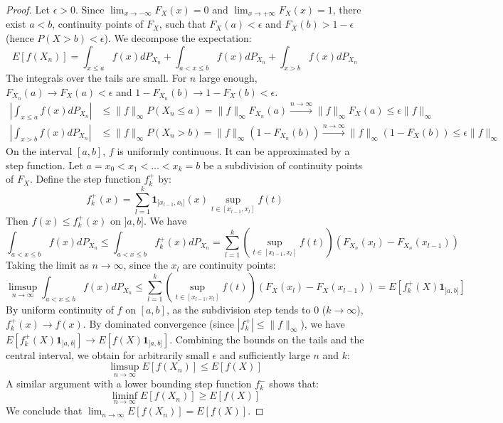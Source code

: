 \begin{proof}
Let $\epsilon > 0$. Since $\lim_{x \to -\infty} F_X(x) = 0$ and $\lim_{x \to +\infty} F_X(x) = 1$, there exist $a < b$, continuity points of $F_X$, such that $F_X(a) < \epsilon$ and $F_X(b) > 1-\epsilon$ (hence $P(X>b) < \epsilon$).
We decompose the expectation:
\[ E[f(X_n)] = \int_{x \le a} f(x) dP_{X_n} + \int_{a < x \le b} f(x) dP_{X_n} + \int_{x > b} f(x) dP_{X_n} \]
The integrals over the tails are small. For $n$ large enough, $F_{X_n}(a) \to F_X(a) < \epsilon$ and $1-F_{X_n}(b) \to 1-F_X(b) < \epsilon$.
\begin{align*}
    \left| \int_{x \le a} f(x) dP_{X_n} \right| &\le \|f\|_\infty P(X_n \le a) = \|f\|_\infty F_{X_n}(a) \xrightarrow{n \to \infty} \|f\|_\infty F_X(a) \le \epsilon \|f\|_\infty \\
    \left| \int_{x > b} f(x) dP_{X_n} \right| &\le \|f\|_\infty P(X_n > b) = \|f\|_\infty (1-F_{X_n}(b)) \xrightarrow{n \to \infty} \|f\|_\infty (1-F_X(b)) \le \epsilon \|f\|_\infty
\end{align*}
On the interval $[a,b]$, $f$ is uniformly continuous. It can be approximated by a step function. Let $a=x_0 < x_1 < \dots < x_k = b$ be a subdivision of continuity points of $F_X$. Define the step function $f_k^+$ by:
\[ f_k^+(x) = \sum_{l=1}^k \mathbf{1}_{]x_{l-1}, x_l]}(x) \sup_{t \in [x_{l-1}, x_l]} f(t) \]
Then $f(x) \le f_k^+(x)$ on $]a,b]$. We have
\[ \int_{a < x \le b} f(x) dP_{X_n} \le \int_{a < x \le b} f_k^+(x) dP_{X_n} = \sum_{l=1}^k \left( \sup_{t \in [x_{l-1}, x_l]} f(t) \right) (F_{X_n}(x_l) - F_{X_n}(x_{l-1})) \]
Taking the limit as $n \to \infty$, since the $x_l$ are continuity points:
\[ \limsup_{n \to \infty} \int_{a < x \le b} f(x) dP_{X_n} \le \sum_{l=1}^k \left( \sup_{t \in [x_{l-1}, x_l]} f(t) \right) (F_{X}(x_l) - F_{X}(x_{l-1})) = E[f_k^+(X)\mathbf{1}_{]a,b]}] \]
By uniform continuity of $f$ on $[a,b]$, as the subdivision step tends to 0 ($k \to \infty$), $f_k^+(x) \to f(x)$. By dominated convergence (since $|f_k^+| \le \|f\|_\infty$), we have $E[f_k^+(X)\mathbf{1}_{]a,b]}] \to E[f(X)\mathbf{1}_{]a,b]}]$.
Combining the bounds on the tails and the central interval, we obtain for arbitrarily small $\epsilon$ and sufficiently large $n$ and $k$:
\[ \limsup_{n \to \infty} E[f(X_n)] \le E[f(X)] \]
A similar argument with a lower bounding step function $f_k^-$ shows that:
\[ \liminf_{n \to \infty} E[f(X_n)] \ge E[f(X)] \]
We conclude that $\lim_{n \to \infty} E[f(X_n)] = E[f(X)]$.
\end{proof}
